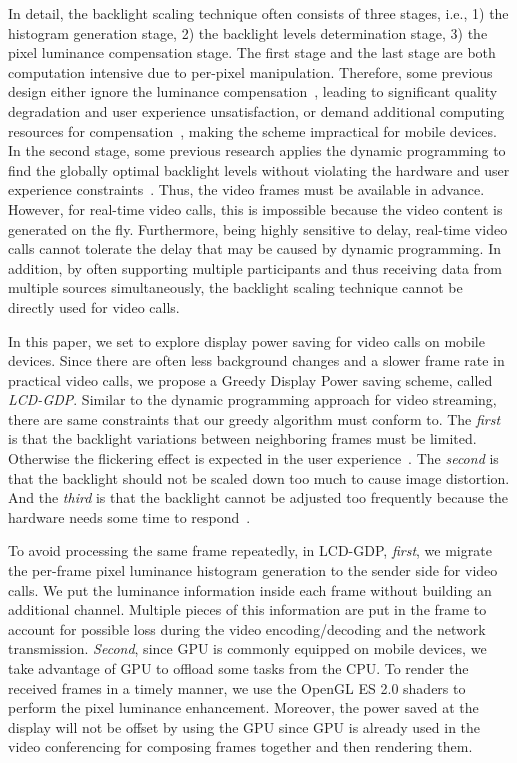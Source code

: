 In detail, the backlight scaling technique often consists of three
stages, i.e., 1) the histogram generation stage, 2) the backlight
levels determination stage, 3) the pixel luminance compensation stage. The first
stage and the last stage are both computation intensive due to
per-pixel manipulation. Therefore, some previous design either ignore
the luminance compensation~\cite{HLH11,LHH14}, leading to significant
quality degradation and user experience unsatisfaction, or demand
additional computing resources for compensation~\cite{PMLDV03,CMEDV07}, making
the scheme impractical for mobile devices.  In the second stage,
some previous research applies the dynamic programming to find the
globally optimal backlight levels without violating the hardware and
user experience constraints~\cite{HLH11,LHH14}. Thus, the video frames must be available
in advance.  However, for real-time video calls, this is impossible
because the video content is generated on the fly. Furthermore, being
highly sensitive to delay, real-time video calls cannot tolerate the
delay that may be caused by dynamic programming. In addition, by
often supporting multiple participants and thus receiving data from
multiple sources simultaneously, the backlight scaling technique
cannot be directly used for video calls.

In this paper, we set to explore display power saving for video
calls on mobile devices. Since there are often less background changes
and a slower frame rate in practical video calls, we propose a Greedy
Display Power saving scheme, called {\it LCD-GDP}.  Similar to the
dynamic programming approach for video streaming, there are same
constraints that our greedy algorithm must conform to. The {\it first}
is that the backlight variations between neighboring frames must be
limited. Otherwise the flickering effect is expected in the user
experience~\cite{iranli2006hvs}. The {\it second} is that the backlight should not be
scaled down too much to cause image distortion. And the {\it third} is
that the backlight cannot be adjusted too frequently because the
hardware needs some time to respond~\cite{pasricha2004dynamic}.

To avoid processing the same frame repeatedly, in LCD-GDP, {\it first},
we migrate the per-frame pixel luminance histogram generation 
to the sender side for video calls. We put the luminance information inside each frame
without building an additional channel. Multiple pieces of this information are put
in the frame to account for possible loss during the video encoding/decoding and
the network transmission. {\it Second}, since GPU is commonly equipped
on mobile devices, we take advantage of GPU to offload some tasks
from the CPU. To render the received frames in a
timely manner, we use the OpenGL ES 2.0 shaders to perform the pixel luminance
enhancement.  Moreover, the power saved at the display will not be offset by
using the GPU since GPU is already used in the video conferencing for
composing frames together and then rendering them.

